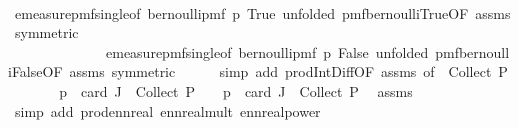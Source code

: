 \begin{isabellebody}
\ \ \ \ \isamarkupfalse%
\ emeasure{\isacharunderscore}{\kern0pt}pmf{\isacharunderscore}{\kern0pt}single{\isacharbrackleft}{\kern0pt}of\ {\isachardoublequoteopen}bernoulli{\isacharunderscore}{\kern0pt}pmf\ p{\isachardoublequoteclose}\ True{\isacharcomma}{\kern0pt}\ unfolded\ pmf{\isacharunderscore}{\kern0pt}bernoulli{\isacharunderscore}{\kern0pt}True{\isacharbrackleft}{\kern0pt}OF\ assms{\isacharparenleft}{\kern0pt}{}{\isacharcomma}{\kern0pt}{}{\isacharparenright}{\kern0pt}{\isacharbrackright}{\kern0pt}{\isacharcomma}{\kern0pt}\ symmetric{\isacharbrackright}{\kern0pt}\isanewline
\ \ \ \ \ \ \ \ \ \ \ \ \ \ emeasure{\isacharunderscore}{\kern0pt}pmf{\isacharunderscore}{\kern0pt}single{\isacharbrackleft}{\kern0pt}of\ {\isachardoublequoteopen}bernoulli{\isacharunderscore}{\kern0pt}pmf\ p{\isachardoublequoteclose}\ False{\isacharcomma}{\kern0pt}\ unfolded\ pmf{\isacharunderscore}{\kern0pt}bernoulli{\isacharunderscore}{\kern0pt}False{\isacharbrackleft}{\kern0pt}OF\ assms{\isacharparenleft}{\kern0pt}{}{\isacharcomma}{\kern0pt}{}{\isacharparenright}{\kern0pt}{\isacharbrackright}{\kern0pt}{\isacharcomma}{\kern0pt}\ symmetric{\isacharbrackright}{\kern0pt}\isanewline
\ \ \ \ \isamarkupfalse%
\ {\isacharparenleft}{\kern0pt}simp\ add{\isacharcolon}{\kern0pt}\ prod{\isachardot}{\kern0pt}Int{\isacharunderscore}{\kern0pt}Diff{\isacharbrackleft}{\kern0pt}OF\ assms{\isacharparenleft}{\kern0pt}{}{\isacharparenright}{\kern0pt}{\isacharcomma}{\kern0pt}\ of\ {\isacharunderscore}{\kern0pt}\ {\isachardoublequoteopen}Collect\ P{\isachardoublequoteclose}{\isacharbrackright}{\kern0pt}{\isacharparenright}{\kern0pt}\isanewline
\ \ \isamarkupfalse%
\ \isamarkupfalse%
\ {\isachardoublequoteopen}{\isachardot}{\kern0pt}{\isachardot}{\kern0pt}{\isachardot}{\kern0pt}\ {\isacharequal}{\kern0pt}\ p\ {\isacharcircum}{\kern0pt}\ card\ {\isacharparenleft}{\kern0pt}J\ {\isasyminter}\ Collect\ P{\isacharparenright}{\kern0pt}\ {\isacharasterisk}{\kern0pt}\ {\isacharparenleft}{\kern0pt}{}\ {\isacharminus}{\kern0pt}\ p{\isacharparenright}{\kern0pt}\ {\isacharcircum}{\kern0pt}\ card\ {\isacharparenleft}{\kern0pt}J\ {\isacharminus}{\kern0pt}\ Collect\ P{\isacharparenright}{\kern0pt}{\isachardoublequoteclose}\ \isamarkupfalse%
\ assms\ \isamarkupfalse%
\ {\isacharparenleft}{\kern0pt}simp\ add{\isacharcolon}{\kern0pt}\ prod{\isacharunderscore}{\kern0pt}ennreal\ ennreal{\isacharunderscore}{\kern0pt}mult{\isacharprime}{\kern0pt}\ ennreal{\isacharunderscore}{\kern0pt}power{\isacharparenright}{\kern0pt}\isanewline

\end{isabellebody}
